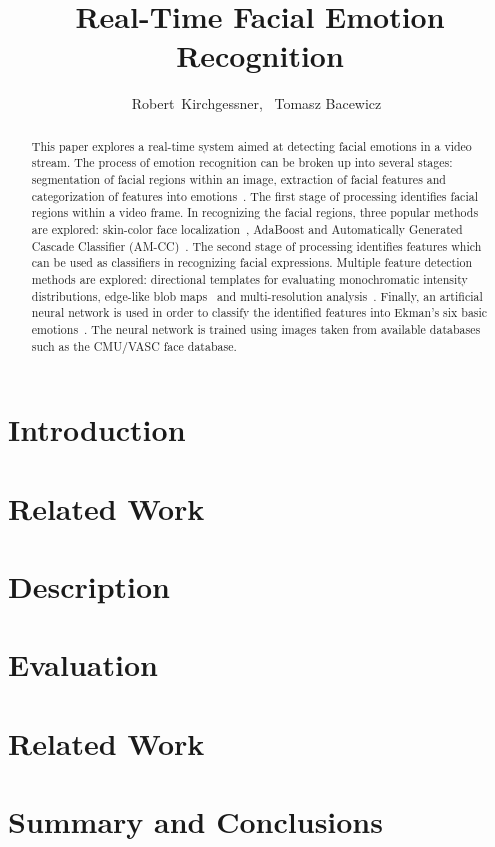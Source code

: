 \documentclass[11pt, journal]{IEEEtran}
\title{Real-Time Facial Emotion Recognition}
\author{Robert~Kirchgessner,~\IEEEmembership{Graduate Student}
Tomasz Bacewicz~\IEEEmembership{Graduate Student}}
\begin{document}
\maketitle

\begin{abstract}
This paper explores a real-time system aimed at detecting facial emotions in a video stream.
The process of emotion recognition can be broken up into several stages: segmentation of facial regions within an image, extraction of facial features and categorization of features
into emotions~\cite{FacialExprRecogIntegratedApproach}. The first stage of processing identifies facial regions within a video frame. In recognizing the facial regions, three popular
methods are explored: skin-color face localization~\cite{FuzzyEmoModel}, AdaBoost and Automatically Generated 
Cascade Classifier (AM-CC)~\cite{RealTimeFaceDetection,ImprovedAdaboostFaceDetection}. The second stage of processing identifies features which can
be used as classifiers in recognizing facial expressions. Multiple feature detection methods are explored: directional templates for evaluating 
monochromatic intensity distributions, edge-like blob maps~\cite{FacialFeatHumanRobo} and multi-resolution analysis~\cite{RealTimeFeatureExtraction}.
Finally, an artificial neural network is used in order to classify the identified features into Ekman's six basic emotions~\cite{FacialExprRecogIntegratedApproach}. The neural network is trained using images taken from available databases such as the CMU/VASC face database.
\end{abstract}

\section{Introduction}
\section{Related Work}
\section{Description}
\section{Evaluation}
\section{Related Work}
\section{Summary and Conclusions}

\newpage 


\end{document}
